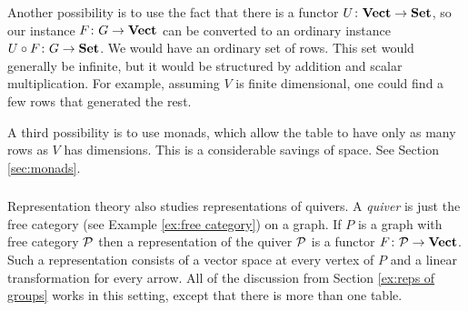 \documentclass[CT4S-EN-RU]{subfiles}
\begin{document}
\begin{blockRUS}
\end{blockRUS}

\begin{blockENG}
Another possibility is to use the fact that there is a functor $U\colon{\mathbf{Vect}}\rightarrow{\mathbf{Set}}$, so our instance $F\colon G\rightarrow{\mathbf{Vect}}$ can be converted to an ordinary instance $U\circ F\colon G\rightarrow{\mathbf{Set}}$. We would have an ordinary set of rows. This set would generally be infinite, but it would be structured by addition and scalar multiplication. For example, assuming $V$ is finite dimensional, one could find a few rows that generated the rest. 
\end{blockENG}

\begin{blockRUS}
\end{blockRUS}

\begin{blockENG}
A third possibility is to use monads, which allow the table to have only as many rows as $V$ has dimensions. This is a considerable savings of space. See Section \ref{sec:monads}.
\end{blockENG}

\begin{blockRUS}
\end{blockRUS}


\subsubsection{}

\begin{blockENG}
Representation theory also studies representations of quivers. A {\em quiver} is just the free category (see Example \ref{ex:free category}) on a graph. If $P$ is a graph with free category $\mathcal{P}$ then a representation of the quiver $\mathcal{P}$ is a functor $F\colon\mathcal{P}\rightarrow{\mathbf{Vect}}$. Such a representation consists of a vector space at every vertex of $P$ and a linear transformation for every arrow. All of the discussion from Section \ref{ex:reps of groups} works in this setting, except that there is more than one table.
\end{blockENG}

\begin{blockRUS}
\end{blockRUS}
\end{document}
